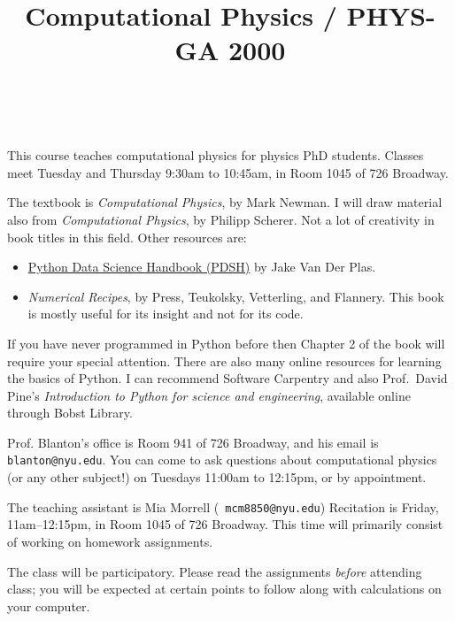 \documentclass[11pt, preprint]{aastex}
\begin{document}
\title{\bf Computational Physics / PHYS-GA 2000}
~
~


\noindent This course teaches computational physics for physics PhD
students. Classes meet Tuesday and Thursday 9:30am to 10:45am, in Room
1045 of 726 Broadway.

\noindent The textbook is {\it Computational Physics}, by Mark
Newman. I will draw material also from {\it Computational Physics}, by
Philipp Scherer. Not a lot of creativity in book titles in this
field. Other resources are:
\begin{itemize}
\item
  \href{https://jakevdp.github.io/PythonDataScienceHandbook/}{Python
    Data Science Handbook (PDSH)} by Jake Van Der Plas.
\item {\it Numerical Recipes}, by Press, Teukolsky, Vetterling, and
  Flannery. This book is mostly useful for its insight and not for its
  code.
\end{itemize}

\noindent If you have never programmed in Python before then Chapter 2
of the book will require your special attention. There are also many
online resources for learning the basics of Python. I can recommend
Software Carpentry and also Prof.~David Pine's {\it Introduction to
  Python for science and engineering}, available online through Bobst
Library.

\noindent Prof. Blanton's office is Room 941 of 726 Broadway, and his
email is {\tt blanton@nyu.edu}. You can come to ask questions about
computational physics (or any other subject!) on Tuesdays 11:00am to
12:15pm, or by appointment.

\noindent The teaching assistant is Mia Morrell ({\tt
  mcm8850@nyu.edu}) Recitation is Friday, 11am--12:15pm, in Room 1045
of 726 Broadway. This time will primarily consist of working on
homework assignments.

\noindent The class will be participatory. Please read the assignments
          {\it before} attending class; you will be expected at
          certain points to follow along with calculations on your
          computer.
\end{document}

